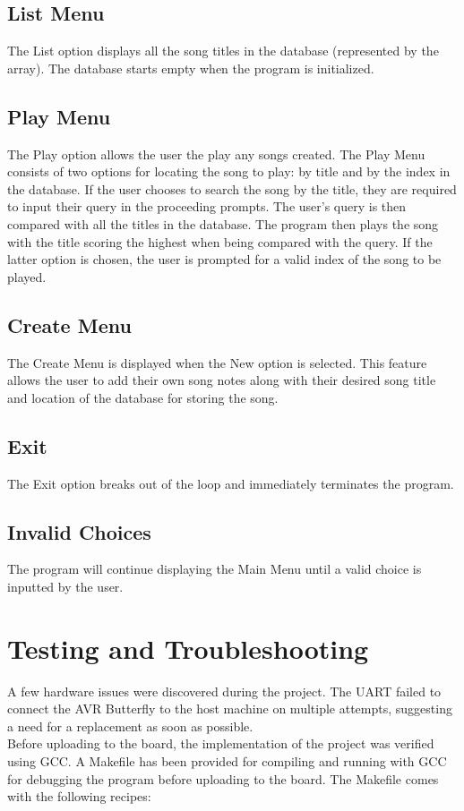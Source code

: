 \documentclass[usletter, 12pt]{article}
\begin{document}
        \subsection{List Menu}
        The List option displays all the song titles in the database (represented by the \codeword{song_title_list[}\codeword{][}\codeword{]} array). The database starts empty when the program is initialized.

        \subsection{Play Menu}
        The Play option allows the user the play any songs created. The Play Menu consists of two options for locating the song to play: by title and by the index in the database. If the user chooses to search the song by the title, they are required to input their query in the proceeding prompts. The user's query is then compared with all the titles in the database. The program then plays the song with the title scoring the highest when being compared with the query. If the latter option is chosen, the user is prompted for a valid index of the song to be played.

        \subsection{Create Menu}
        The Create Menu is displayed when the New option is selected. This feature allows the user to add their own song notes along with their desired song title and location of the database for storing the song.

        \subsection{Exit}
        The Exit option breaks out of the loop and immediately terminates the program.

        \subsection{Invalid Choices}
        The program will continue displaying the Main Menu until a valid choice is inputted by the user.


    \section{Testing and Troubleshooting}
    A few hardware issues were discovered during the project. The UART failed to connect the AVR Butterfly to the host machine on multiple attempts, suggesting a need for a replacement as soon as possible. \\
    \noindent Before uploading to the board, the implementation of the project was verified using GCC. A Makefile has been provided for compiling and running with GCC for debugging the program before uploading to the board. The Makefile comes with the following recipes:
\end{document}
